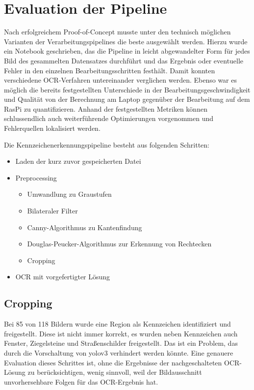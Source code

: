 
\section{Evaluation der Pipeline}

Nach erfolgreichem Proof-of-Concept musste unter den technisch möglichen Varianten der Verarbeitungspipelines die beste ausgewählt werden. Hierzu wurde ein Notebook geschrieben, das die Pipeline in leicht abgewandelter Form für jedes Bild des gesammelten Datensatzes durchführt und das Ergebnis oder eventuelle Fehler in den einzelnen Bearbeitungsschritten festhält. Damit konnten verschiedene OCR-Verfahren untereinander verglichen werden. Ebenso war es möglich die bereits festgestellten Unterschiede in der Bearbeitungsgeschwindigkeit und Qualität von der Berechnung am Laptop gegenüber der Bearbeitung auf dem RasPi zu quantifizieren. Anhand der festgestellten Metriken können schlussendlich auch weiterführende Optimierungen vorgenommen und Fehlerquellen lokalisiert werden.

Die Kennzeichenerkennungspipeline besteht aus folgenden Schritten:

\begin{itemize}
\item Laden der kurz zuvor gespeicherten Datei
\item Preprocessing
\begin{itemize}
\item Umwandlung zu Graustufen
\item Bilateraler Filter
\item Canny-Algorithmus zu Kantenfindung
\item Douglas-Peucker-Algorithmus zur Erkennung von Rechtecken
\item Cropping
\end{itemize}
\item OCR mit vorgefertigter Lösung
\end{itemize}

																																																				 


\subsection{Cropping}
Bei 85 von 118 Bildern wurde eine Region als Kennzeichen identifiziert und freigestellt.
Diese ist nicht immer korrekt, es wurden neben Kennzeichen auch Fenster, Ziegelsteine und Straßenschilder freigestellt.
Das ist ein Problem, das durch die Vorschaltung von yolov3 verhindert werden könnte. 
Eine genauere Evaluation dieses Schrittes ist, ohne die Ergebnisse der nachgeschalteten OCR-Lösung zu berücksichtigen, wenig sinnvoll, weil der Bildausschnitt unvorhersehbare Folgen für das OCR-Ergebnis hat.


